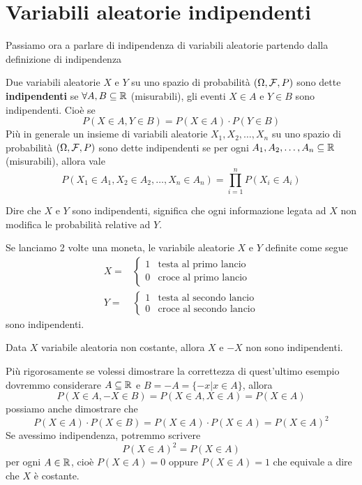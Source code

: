 \section{Variabili aleatorie indipendenti}
Passiamo ora a parlare di indipendenza di variabili aleatorie partendo dalla definizione di
indipendenza

\begin{definition}
	Due variabili aleatorie $X$ e $Y$ su uno spazio di probabilità $(\Omega, \mathcal{F}, P)$ sono dette
	\textbf{indipendenti} se $\forall A, B \subseteq \mathbb{R}$ (misurabili), gli eventi $X \in A$ e
	$Y \in B$ sono indipendenti. Cioè se
	\[ P(X \in A, Y \in B) = P(X \in A) \cdot P(Y \in B) \]
	Più in generale un insieme di variabili aleatorie $X_1, X_2, \dots, X_n$ su uno spazio di
	probabilità $(\Omega, \mathcal{F}, P)$ sono dette indipendenti se per ogni
	$A_1, A_2, \dots, A_n \subseteq \mathbb{R}$ (misurabili), allora vale
	\[ P(X_1 \in A_1, X_2 \in A_2, \dots, X_n \in A_n) = \prod_{i=1}^n P(X_i \in A_i) \]
\end{definition}

Dire che $X$ e $Y$ sono indipendenti, significa che ogni informazione legata ad $X$ non modifica
le probabilità relative ad $Y$.

\begin{example}
	Se lanciamo 2 volte una moneta, le variabile aleatorie $X$ e $Y$ definite come segue
	\begin{align*}
		X = & \begin{cases}
			      1 & \text{testa al primo lancio} \\
			      0 & \text{croce al primo lancio}
		      \end{cases}   \\[1ex]
		Y = & \begin{cases}
			      1 & \text{testa al secondo lancio} \\
			      0 & \text{croce al secondo lancio}
		      \end{cases}
	\end{align*}
	sono indipendenti.
\end{example}

\begin{example}
	Data $X$ variabile aleatoria non costante, allora $X$ e $-X$ non sono indipendenti.
\end{example}

Più rigorosamente se volessi dimostrare la correttezza di quest'ultimo esempio dovremmo considerare
$A \subseteq \mathbb{R}$ e $B = -A = \{ -x | x \in A \}$, allora
\[ P(X \in A, -X \in B) = P(X \in A, X \in A) = P(X \in A) \]
possiamo anche dimostrare che
\[ P(X \in A) \cdot P(X \in B) = P(X \in A) \cdot P(X \in A) = P(X \in A)^2 \]
Se avessimo indipendenza, potremmo scrivere
\[ P(X \in A)^2 = P(X \in A) \]
per ogni $A \in \mathbb{R}$, cioè $P(X \in A) = 0$ oppure $P(X \in A) = 1$ che equivale a dire che $X$ è
costante.

